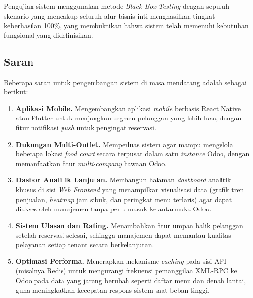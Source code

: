 \documentclass[conference]{IEEEtran}
\begin{document}
Pengujian sistem menggunakan metode \textit{Black-Box Testing} dengan sepuluh skenario yang mencakup seluruh alur bisnis inti menghasilkan tingkat keberhasilan 100\%, yang membuktikan bahwa sistem telah memenuhi kebutuhan fungsional yang didefinisikan.

\subsection{Saran}
Beberapa saran untuk pengembangan sistem di masa mendatang adalah sebagai berikut:

\begin{enumerate}
    \item \textbf{Aplikasi Mobile.} Mengembangkan aplikasi \textit{mobile} berbasis React Native atau Flutter untuk menjangkau segmen pelanggan yang lebih luas, dengan fitur notifikasi \textit{push} untuk pengingat reservasi.
    
    \item \textbf{Dukungan Multi-Outlet.} Memperluas sistem agar mampu mengelola beberapa lokasi \textit{food court} secara terpusat dalam satu \textit{instance} Odoo, dengan memanfaatkan fitur \textit{multi-company} bawaan Odoo.
    
    \item \textbf{Dasbor Analitik Lanjutan.} Membangun halaman \textit{dashboard} analitik khusus di sisi \textit{Web Frontend} yang menampilkan visualisasi data (grafik tren penjualan, \textit{heatmap} jam sibuk, dan peringkat menu terlaris) agar dapat diakses oleh manajemen tanpa perlu masuk ke antarmuka Odoo.
    
    \item \textbf{Sistem Ulasan dan Rating.} Menambahkan fitur umpan balik pelanggan setelah reservasi selesai, sehingga manajemen dapat memantau kualitas pelayanan setiap tenant secara berkelanjutan.
        
    \item \textbf{Optimasi Performa.} Menerapkan mekanisme \textit{caching} pada sisi API (misalnya Redis) untuk mengurangi frekuensi pemanggilan XML-RPC ke Odoo pada data yang jarang berubah seperti daftar menu dan denah lantai, guna meningkatkan kecepatan respons sistem saat beban tinggi.
\end{enumerate}
\end{document}
